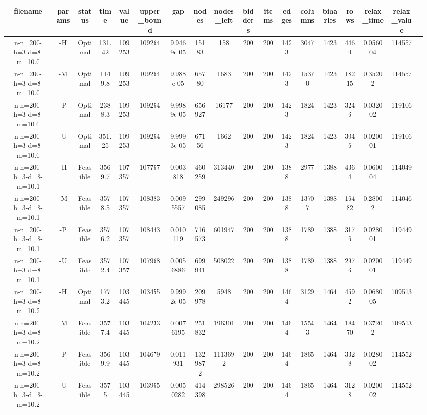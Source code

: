 \documentclass[landscape, a4paper]{article}
\begin{document}
\begin{center}
\begin{tabular}{@{}cccccccccccccccccc@{}}
filename & params & status & time & value & upper\_bound & gap & nodes & nodes\_left & bidders & items & edges & columns & binaries & rows & relax\_time & relax\_value & \\
\hline
n-n=200-h=3-d=8-m=10.0 & -H & Optimal & 131.42 & 109253 & 109264 & 9.9469e-05 & 15183 & 158 & 200 & 200 & 1423 & 3047 & 1423 & 4469 & 0.056004 & 114557 & \\
n-n=200-h=3-d=8-m=10.0 & -M & Optimal & 1149.8 & 109253 & 109264 & 9.988e-05 & 65780 & 1683 & 200 & 200 & 1423 & 15370 & 1423 & 18215 & 0.35202 & 114557 & \\
n-n=200-h=3-d=8-m=10.0 & -P & Optimal & 2388.3 & 109253 & 109264 & 9.9989e-05 & 656927 & 16177 & 200 & 200 & 1423 & 1824 & 1423 & 3246 & 0.032002 & 119106 & \\
n-n=200-h=3-d=8-m=10.0 & -U & Optimal & 351.25 & 109253 & 109264 & 9.9993e-05 & 67156 & 1662 & 200 & 200 & 1423 & 1824 & 1423 & 3046 & 0.020001 & 119106 & \\
n-n=200-h=3-d=8-m=10.1 & -H & Feasible & 3569.7 & 107357 & 107767 & 0.003818 & 460259 & 313440 & 200 & 200 & 1388 & 2977 & 1388 & 4364 & 0.060004 & 114049 & \\
n-n=200-h=3-d=8-m=10.1 & -M & Feasible & 3578.5 & 107357 & 108383 & 0.0095557 & 299085 & 249296 & 200 & 200 & 1388 & 13707 & 1388 & 16482 & 0.28002 & 114046 & \\
n-n=200-h=3-d=8-m=10.1 & -P & Feasible & 3576.2 & 107357 & 108443 & 0.010119 & 716573 & 601947 & 200 & 200 & 1388 & 1789 & 1388 & 3176 & 0.028001 & 119449 & \\
n-n=200-h=3-d=8-m=10.1 & -U & Feasible & 3572.4 & 107357 & 107968 & 0.0056886 & 699941 & 508022 & 200 & 200 & 1388 & 1789 & 1388 & 2976 & 0.020001 & 119449 & \\
n-n=200-h=3-d=8-m=10.2 & -H & Optimal & 1773.2 & 103445 & 103455 & 9.9992e-05 & 209978 & 5948 & 200 & 200 & 1464 & 3129 & 1464 & 4592 & 0.068005 & 109513 & \\
n-n=200-h=3-d=8-m=10.2 & -M & Feasible & 3577.4 & 103445 & 104233 & 0.0076195 & 251832 & 196301 & 200 & 200 & 1464 & 15543 & 1464 & 18470 & 0.37202 & 109513 & \\
n-n=200-h=3-d=8-m=10.2 & -P & Feasible & 3569.9 & 103445 & 104679 & 0.011931 & 1329872 & 1113692 & 200 & 200 & 1464 & 1865 & 1464 & 3328 & 0.028002 & 114552 & \\
n-n=200-h=3-d=8-m=10.2 & -U & Feasible & 3575 & 103445 & 103965 & 0.0050282 & 414398 & 298526 & 200 & 200 & 1464 & 1865 & 1464 & 3128 & 0.020002 & 114552 & \\

\end{tabular}
\end{center}
\end{document}
